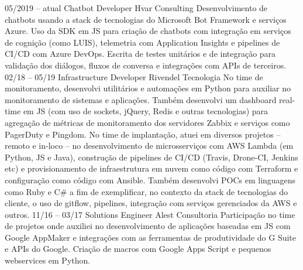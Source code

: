 \documentclass[9pt]{developercv} %
\begin{document}
\begin{entrylist}
	\entry
		{05/2019 -- atual}
		{Chatbot Developer}
		{Hvar Consulting}
		{
            Desenvolvimento de chatbots usando a stack de tecnologias do
            Microsoft Bot Framework e serviços Azure. Uso da SDK em JS para
            criação de chatbots com integração em serviços de cognição (como
            LUIS), telemetria com Application Insights e pipelines de CI/CD com
            Azure DevOps. Escrita de testes unitários e de integração para
            validação dos diálogos, fluxos de conversa e integrações com APIs
            de terceiros.
        }
	\entry
		{02/18 -- 05/19}
		{Infrastructure Developer}
		{Rivendel Tecnologia}
		{
            No time de monitoramento, desenvolvi utilitários e automações em
            Python para auxiliar no monitoramento de sistemas e aplicações.
            Também desenvolvi um dashboard real-time em JS (com uso de sockets,
            jQuery, Redis e outras tecnologias) para agregação de métricas de
            monitoramento dos servidores Zabbix e serviços como PagerDuty e
            Pingdom.\newline\newline
            No time de implantação, atuei em diversos projetos -- remoto e
            in-loco -- no desenvolvimento de microsserviços com AWS Lambda (em
            Python, JS e Java), construção de pipelines de CI/CD (Travis,
            Drone-CI, Jenkins etc) e provisionamento de infraestrutura em nuvem
            como código com Terraform e configuração como código com Ansible.
            Também desenvolvi POCs em linguagens como Ruby e C\# a fim de
            exemplificar, no contexto da stack de tecnologias do cliente, o uso
            de gitflow, pipelines, integração com serviços gerenciados da AWS e
            outros.
        }
	\entry
		{11/16 -- 03/17}
		{Solutions Engineer}
		{Alest Consultoria}
		{
            Participação no time de projetos onde auxiliei no desenvolvimento
            de aplicações baseadas em JS com Google AppMaker e integrações com
            as ferramentas de produtividade do G Suite e APIs do Google.
            Criação de macros com Google Apps Script e pequenos webservices em
            Python.
        }
\end{entrylist}


\end{document}

